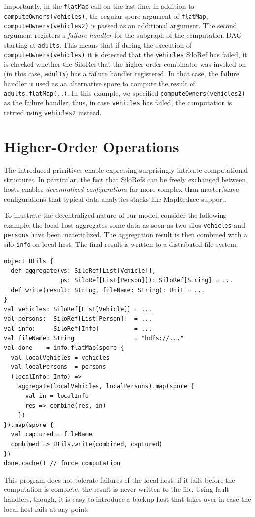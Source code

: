 \documentclass[preprint]{sigplanconf}
\theoremstyle{definition}
\theoremstyle{definition}
\begin{document}
Importantly, in the \verb|flatMap| call on the last line, in addition to
\verb|computeOwners(vehicles)|, the regular spore argument of \verb|flatMap|,
\verb|computeOwners(vehicles2)| is passed as an additional argument. The
second argument registers a \emph{failure handler} for the subgraph of the
computation DAG starting at \verb|adults|. This means that if during the
execution of \verb|computeOwners(vehicles)| it is detected that the
\verb|vehicles| SiloRef has failed, it is checked whether the SiloRef that the
higher-order combinator was invoked on (in this case, \verb|adults|) has a
failure handler registered. In that case, the failure handler is used as an
alternative spore to compute the result of \verb|adults.flatMap(..)|. In this
example, we specified \verb|computeOwners(vehicles2)| as the failure handler;
thus, in case \verb|vehicles| has failed, the computation is retried using
\verb|vehicles2| instead.





\section{Higher-Order Operations}
\label{sec:higher-order-operations}

The introduced primitives enable expressing surprisingly intricate
computational structures. In particular, the fact that SiloRefs can be freely
exchanged between hosts enables {\em decentralized configurations} far more
complex than master/slave configurations that typical data analytics stacks
like MapReduce support.

To illustrate the decentralized nature of our model, consider the following
example: the local host aggregates some data as soon as two silos
\verb|vehicles| and \verb|persons| have been materialized. The aggregation
result is then combined with a silo \verb|info| on local host. The final
result is written to a distributed file system:

\begin{lstlisting}
object Utils {
  def aggregate(vs: SiloRef[List[Vehicle]],
                ps: SiloRef[List[Person]]): SiloRef[String] = ...
  def write(result: String, fileName: String): Unit = ...
}
val vehicles: SiloRef[List[Vehicle]] = ...
val persons:  SiloRef[List[Person]]  = ...
val info:     SiloRef[Info]          = ...
val fileName: String                 = "hdfs://..."
val done    = info.flatMap(spore {
  val localVehicles = vehicles
  val localPersons  = persons
  (localInfo: Info) =>
    aggregate(localVehicles, localPersons).map(spore {
      val in = localInfo
      res => combine(res, in)
    })
}).map(spore {
  val captured = fileName
  combined => Utils.write(combined, captured)
})
done.cache() // force computation
\end{lstlisting}
\noindent
This program does not tolerate failures of the local host: if it fails before
the computation is complete, the result is never written to the file. Using
fault handlers, though, it is easy to introduce a backup host that takes over
in case the local host fails at any point:
\end{document}
